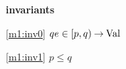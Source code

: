 \textbf{invariants}
\begin{block}
\item[ \eqref{m1:inv0} ]{$qe \in [p,q) \mathbin\rightarrow \text{Val} $} %
\item[ \eqref{m1:inv1} ]{$p \le q $} %
\end{block}

